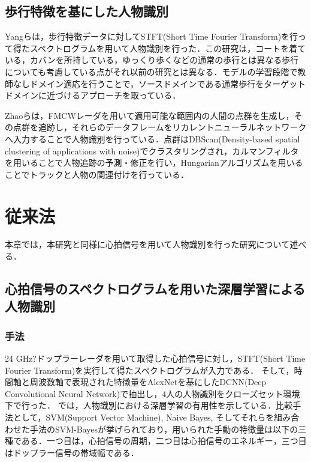 
\section{歩行特徴を基にした人物識別}
Yangらは，歩行特徴データに対してSTFT(Short Time Fourier Transform)を行って得たスペクトログラムを用いて人物識別を行った\cite{paper:unsupervised}．この研究は，コートを着ている，カバンを所持している，ゆっくり歩くなどの通常の歩行とは異なる歩行についても考慮している点がそれ以前の研究とは異なる．モデルの学習段階で教師なしドメイン適応を行うことで，ソースドメインである通常歩行をターゲットドメインに近づけるアプローチを取っている．

Zhaoらは，FMCWレーダを用いて適用可能な範囲内の人間の点群を生成し，その点群を追跡し，それらのデータフレームをリカレントニューラルネットワークへ入力することで人物識別を行っている\cite{paper:human_track}．点群はDBScan(Density-based spatial clustering of applications with noise)\cite{paper:dbscan}でクラスタリングされ，カルマンフィルタ\cite{paper:kalman}を用いることで人物追跡の予測・修正を行い，Hungarianアルゴリズム\cite{paper:Hungarian}を用いることでトラックと人物の関連付けを行っている．

\chapter{従来法}
本章では，本研究と同様に心拍信号を用いて人物識別を行った研究について述べる．

\section{心拍信号のスペクトログラムを用いた深層学習による人物識別\cite{paper:HeartID}}
\subsection{手法}
24 GHz?ドップラーレーダを用いて取得した心拍信号に対し，STFT(Short Time Fourier Transform)を実行して得たスペクトログラムが入力である．
そして，時間軸と周波数軸で表現された特徴量をAlexNetを基にしたDCNN(Deep Convolutional Neural Network)で抽出し，4人の人物識別をクローズセット環境下で行った．
\cite{paper:HeartID}では，人物識別における深層学習の有用性を示している．比較手法として，SVM(Support Vector Machine), Naive Bayes, そしてそれらを組み合わせた手法のSVM-Bayesが挙げられており，用いられた手動の特徴量は以下の三種である．一つ目は，心拍信号の周期，二つ目は心拍信号のエネルギー，三つ目はドップラー信号の帯域幅である．

